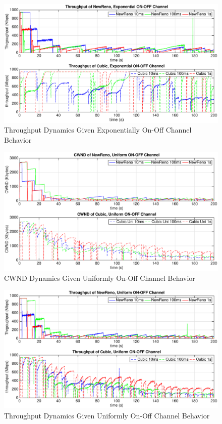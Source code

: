 \begin{figure}
\centering
\includegraphics[width=14cm]{2.eps}
\caption{Throughput Dynamics Given Exponentially On-Off Channel Behavior}
\label{2nd}
\end{figure}
\begin{figure}
\centering
\includegraphics[width=14cm]{3.eps}
\caption{CWND Dynamics Given Uniformly On-Off Channel Behavior}
\label{3rd}
\end{figure}
\begin{figure}
\centering
\includegraphics[width=14cm]{4.eps}
\caption{Throughput Dynamics Given Uniformly On-Off Channel Behavior}
\label{4th}
\end{figure}
